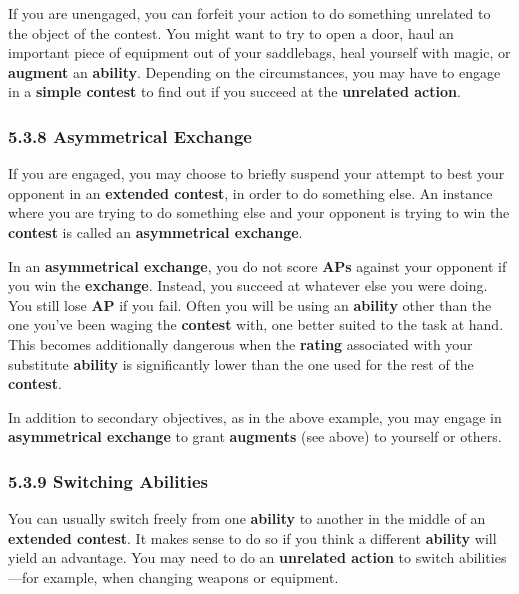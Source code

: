 \documentclass[
]{article}
\begin{document}
If you are unengaged, you can forfeit your action to do something
unrelated to the object of the contest. You might want to try to open a
door, haul an important piece of equipment out of your saddlebags, heal
yourself with magic, or \textbf{augment} an \textbf{ability}. Depending
on the circumstances, you may have to engage in a \textbf{simple
contest} to find out if you succeed at the \textbf{unrelated action}.

\hypertarget{asymmetrical-exchange}{%
\subsubsection{5.3.8 Asymmetrical
Exchange}\label{asymmetrical-exchange}}

If you are engaged, you may choose to briefly suspend your attempt to
best your opponent in an \textbf{extended contest}, in order to do
something else. An instance where you are trying to do something else
and your opponent is trying to win the \textbf{contest} is called an
\textbf{asymmetrical exchange}.

In an \textbf{asymmetrical exchange}, you do not score \textbf{APs}
against your opponent if you win the \textbf{exchange}. Instead, you
succeed at whatever else you were doing. You still lose \textbf{AP} if
you fail. Often you will be using an \textbf{ability} other than the one
you've been waging the \textbf{contest} with, one better suited to the
task at hand. This becomes additionally dangerous when the
\textbf{rating} associated with your substitute \textbf{ability} is
significantly lower than the one used for the rest of the
\textbf{contest}.

In addition to secondary objectives, as in the above example, you may
engage in \textbf{asymmetrical exchange} to grant \textbf{augments} (see
above) to yourself or others.

\hypertarget{switching-abilities-1}{%
\subsubsection{5.3.9 Switching Abilities}\label{switching-abilities-1}}

You can usually switch freely from one \textbf{ability} to another in
the middle of an \textbf{extended contest}. It makes sense to do so if
you think a different \textbf{ability} will yield an advantage. You may
need to do an \textbf{unrelated action} to switch abilities---for
example, when changing weapons or equipment.
\end{document}
